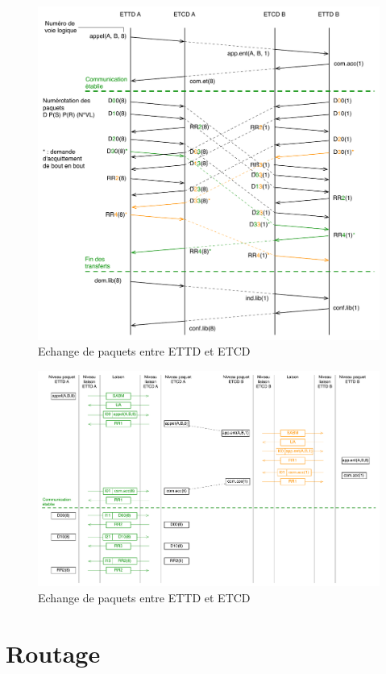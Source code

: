 \documentclass[11pt,english,french]{scrreprt}
\theoremstyle{remark}
\theoremstyle{definition}
\begin{document}
\begin{figure}[h!]
	\center
	\includegraphics[scale=.75]{graphes/echange-paquets1}
	\caption{Echange de paquets entre ETTD et ETCD}
\end{figure}

\begin{figure}[h!]
	\center
	\includegraphics[scale=.5]{graphes/echange-paquets2}
	\caption{Echange de paquets entre ETTD et ETCD}
\end{figure}

\chapter{Routage} %
\end{document}
